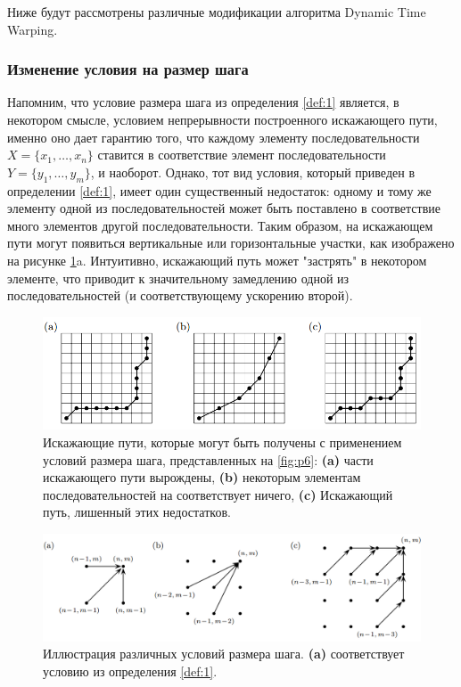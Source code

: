 \documentclass[a4paper, 14pt]{extarticle}
\numberwithin{figure}{subsection}
\let\oldautoref\autoref
\renewcommand{\autoref}[1]{(\oldautoref{#1})}
\numberwithin{equation}{subsection}
\begin{document}
Ниже будут рассмотрены различные модификации алгоритма Dynamic Time Warping.

\subsubsection{Изменение условия на размер шага}
Напомним, что условие размера шага из определения \ref{def:1} является, в некотором смысле, условием непрерывности построенного искажающего пути, именно оно дает гарантию того, что каждому элементу последовательности $X=\{x_1,\dots,x_n\}$ ставится в соответствие элемент последовательности $Y=\{y_1,\dots,y_m\}$, и наоборот. Однако, тот вид условия, который приведен в определении \ref{def:1}, имеет один существенный недостаток: одному и тому же элементу одной из последовательностей может быть поставлено в соответствие много элементов другой последовательности. Таким образом, на искажающем пути могут появиться вертикальные или горизонтальные участки, как изображено на рисунке \ref{fig:p5}a. Интуитивно, искажающий путь может "застрять" в некотором элементе, что приводит к значительному замедлению одной из последовательностей (и соответствующему ускорению второй).

\begin{figure}[h]
\centering
\includegraphics[width=15cm]{p5.png}
\caption{Искажающие пути, которые могут быть получены с применением условий размера шага, представленных на \oldautoref{fig:p6}: {\bf (a)} части искажающего пути вырождены, {\bf (b)} некоторым элементам последовательностей на соответствует ничего, {\bf (c)} Искажающий путь, лишенный этих недостатков.}
\label{fig:p5}
\end{figure}

\begin{figure}[H]
\centering
\includegraphics[width=15cm]{p6.png}
\caption{Иллюстрация различных условий размера шага. {\bf (a)} соответствует условию из определения \ref{def:1}.}
\label{fig:p6}
\end{figure}
\end{document}

